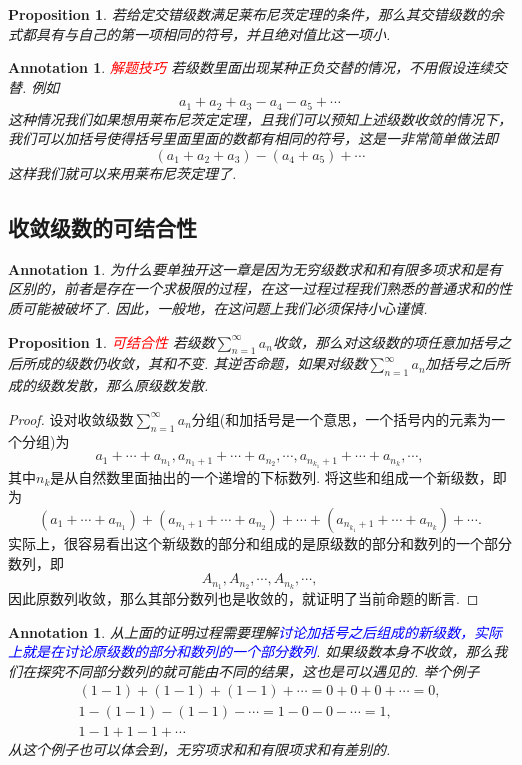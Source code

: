 \documentclass{article}
\newtheorem{proposition}[theorem]{Proposition}
\newtheorem{annotation}[theorem]{Annotation}
\newcommand{\redt}[1]{\textcolor{red}{#1}}
\newcommand{\bluet}[1]{\textcolor{blue}{#1}}
\begin{document}
\begin{proposition}
\rm 若给定交错级数满足莱布尼茨定理的条件，那么其交错级数的余式都具有与自己的第一项相同的符号，并且绝对值比这一项小. 
\end{proposition}

\begin{annotation}
\rm \redt{解题技巧} 若级数里面出现某种正负交替的情况，不用假设连续交替. 例如
$$
a_1+a_2+a_3-a_4-a_5+\cdots
$$
这种情况我们如果想用莱布尼茨定定理，且我们可以预知上述级数收敛的情况下，我们可以加括号使得括号里面里面的数都有相同的符号，这是一非常简单做法即
$$
(a_1+a_2+a_3)-(a_4+a_5)+\cdots
$$
这样我们就可以来用莱布尼茨定理了. 
\end{annotation}

\subsection{收敛级数的可结合性}

\begin{annotation}
\rm 为什么要单独开这一章是因为无穷级数求和和有限多项求和是有区别的，前者是存在一个求极限的过程，在这一过程过程我们熟悉的普通求和的性质可能被破坏了. 因此，一般地，在这问题上我们必须保持小心谨慎. 
\end{annotation}


\begin{proposition}
\rm \redt{可结合性} 若级数$\sum\limits_{n=1}^\infty a_n$收敛，那么对这级数的项任意加括号之后所成的级数仍收敛，其和不变. 其逆否命题，如果对级数$\sum\limits_{n=1}^\infty a_n$加括号之后所成的级数发散，那么原级数发散. 
\end{proposition}

\begin{proof}
\rm 设对收敛级数$\sum\limits_{n=1}^\infty a_n$分组(和加括号是一个意思，一个括号内的元素为一个分组)为
$$
a_1 + \cdots + a_{n_1},a_{n_1 +1 } + \cdots + a_{n_2}, \cdots, a_{n_{k_1}+1} + \cdots + a_{n_k},\cdots, 
$$
其中${n_{k}}$是从自然数里面抽出的一个递增的下标数列. 将这些和组成一个新级数，即为
$$
(a_1 + \cdots + a_{n_1}) + ( a_{n_1 +1 } + \cdots + a_{n_2})+ \cdots + (a_{n_{k_1}+1} + \cdots + a_{n_k}) + \cdots.
$$
实际上，很容易看出这个新级数的部分和组成的是原级数的部分和数列的一个部分数列，即
$$
A_{n_1},A_{n_2},\cdots, A_{n_k},\cdots,
$$
因此原数列收敛，那么其部分数列也是收敛的，就证明了当前命题的断言. 
\end{proof}

\begin{annotation}
\rm 从上面的证明过程需要理解\bluet{讨论加括号之后组成的新级数，实际上就是在讨论原级数的部分和数列的一个部分数列}. 如果级数本身不收敛，那么我们在探究不同部分数列的就可能由不同的结果，这也是可以遇见的. 举个例子
$$
\begin{array}{ll}
(1-1)+(1-1)+(1-1)+\cdots = 0 + 0 + 0 +\cdots = 0, \\
1-(1-1)-(1-1)-\cdots = 1 - 0 - 0 -\cdots = 1, \\
1-1+1-1+\cdots 
\end{array}
$$
从这个例子也可以体会到，无穷项求和和有限项求和有差别的. 
\end{annotation}
\end{document}

